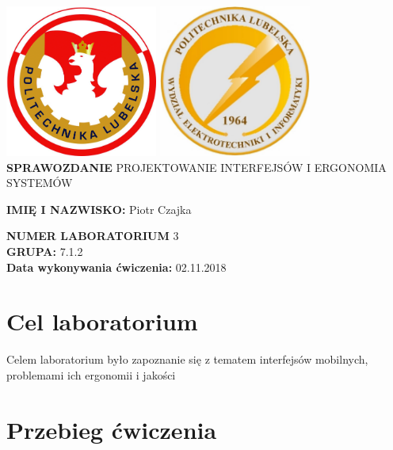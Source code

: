 \documentclass[12pt]{article}
\begin{document}
    \centering
    \includegraphics[width=5cm, height=5cm,]{herbPL.jpg}
    \hspace{2cm}
    \includegraphics[width=5cm, height=5cm]{herbWEII.jpg}\\
    \vspace{2cm}
    {\Huge \textbf{SPRAWOZDANIE}}
    \vspace{2cm}
    \newline
    {\large PROJEKTOWANIE INTERFEJSÓW I ERGONOMIA SYSTEMÓW}
    \vfill
    \raggedright
    \textbf{IMIĘ I NAZWISKO:} Piotr Czajka

    \textbf{NUMER LABORATORIUM} 3\\
    \textbf{GRUPA:} 7.1.2\\
    \textbf{Data wykonywania ćwiczenia:} 02.11.2018\\

    \newpage

    \tableofcontents{}

    \newpage

    \section{Cel laboratorium}
    Celem laboratorium było zapoznanie się z tematem interfejsów mobilnych, problemami ich ergonomii i jakości

    \section{Przebieg ćwiczenia}
\end{document}
